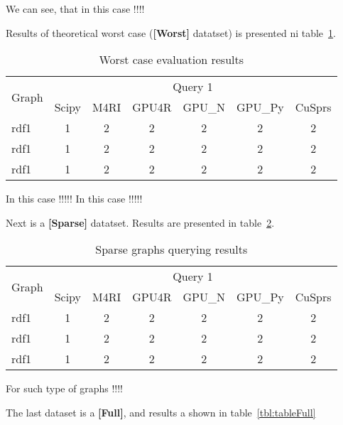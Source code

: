 We can see, that in this case !!!!


Results of theoretical worst case (\textbf{[Worst]} datatset) is presented ni table~\ref{tbl:tableWorst}.



\begin{table}[H]
\caption{Worst case evaluation results}
\label{tbl:tableWorst}
\begin{tabular}{| l | c | c | c | c | c | c | }
    \hline
    \multirow{2}{*}{Graph} & \multicolumn{6}{|c|}{Query 1} \\
    \cline{2-7}
                         & Scipy & M4RI & GPU4R & GPU\_N & GPU\_Py & CuSprs  \\
    \hline
    \hline
    rdf1 & 1 & 2 & 2& 2& 2& 2 \\
    rdf1 & 1 & 2 & 2& 2& 2& 2 \\
    rdf1 & 1 & 2 & 2& 2& 2& 2 \\
    \hline
  \end{tabular}
\end{table}


In this case !!!!!
In this case !!!!!

Next is a \textbf{[Sparse]} datatset.
Results are presented in table~\ref{tbl:tableSparse}.

\begin{table}[H]
\caption{Sparse graphs querying results}
\label{tbl:tableSparse}
\begin{tabular}{| l | c | c | c | c | c | c | }
    \hline
    \multirow{2}{*}{Graph} & \multicolumn{6}{|c|}{Query 1} \\
    \cline{2-7}
                         & Scipy & M4RI & GPU4R & GPU\_N & GPU\_Py & CuSprs  \\
    \hline
    \hline
    rdf1 & 1 & 2 & 2& 2& 2& 2 \\
    rdf1 & 1 & 2 & 2& 2& 2& 2 \\
    rdf1 & 1 & 2 & 2& 2& 2& 2 \\
    \hline
  \end{tabular}
\end{table}


For such type of graphs !!!!

The last dataset is a \textbf{[Full]}, and results a shown in table~\ref{tbl:tableFull}


